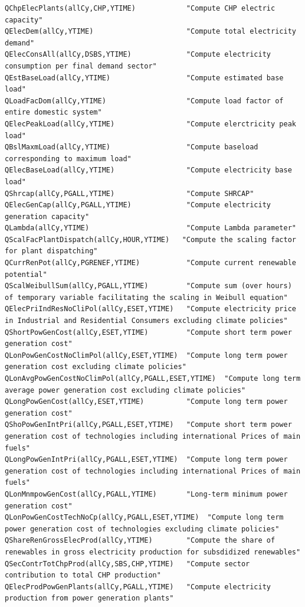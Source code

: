 \documentclass[a4paper,]{scrartcl}
\begin{document}
\begin{lstlisting}
QChpElecPlants(allCy,CHP,YTIME)            "Compute CHP electric capacity"  
QElecDem(allCy,YTIME)                      "Compute total electricity demand"
QElecConsAll(allCy,DSBS,YTIME)             "Compute electricity consumption per final demand sector"
QEstBaseLoad(allCy,YTIME)                  "Compute estimated base load"    
QLoadFacDom(allCy,YTIME)                   "Compute load factor of entire domestic system"
QElecPeakLoad(allCy,YTIME)                 "Compute elerctricity peak load"     
QBslMaxmLoad(allCy,YTIME)                  "Compute baseload corresponding to maximum load"
QElecBaseLoad(allCy,YTIME)                 "Compute electricity base load"
QShrcap(allCy,PGALL,YTIME)                 "Compute SHRCAP" 
QElecGenCap(allCy,PGALL,YTIME)             "Compute electricity generation capacity"
QLambda(allCy,YTIME)                       "Compute Lambda parameter"   
QScalFacPlantDispatch(allCy,HOUR,YTIME)   "Compute the scaling factor for plant dispatching"    
QCurrRenPot(allCy,PGRENEF,YTIME)           "Compute current renewable potential"    
QScalWeibullSum(allCy,PGALL,YTIME)         "Compute sum (over hours) of temporary variable facilitating the scaling in Weibull equation"
QElecPriIndResNoCliPol(allCy,ESET,YTIME)   "Compute electricity price in Industrial and Residential Consumers excluding climate policies"
QShortPowGenCost(allCy,ESET,YTIME)         "Compute short term power generation cost"       
QLonPowGenCostNoClimPol(allCy,ESET,YTIME)  "Compute long term power generation cost excluding climate policies" 
QLonAvgPowGenCostNoClimPol(allCy,PGALL,ESET,YTIME)  "Compute long term average power generation cost excluding climate policies"    
QLongPowGenCost(allCy,ESET,YTIME)          "Compute long term power generation cost"    
QShoPowGenIntPri(allCy,PGALL,ESET,YTIME)   "Compute short term power generation cost of technologies including international Prices of main fuels"  
QLongPowGenIntPri(allCy,PGALL,ESET,YTIME)  "Compute long term power generation cost of technologies including international Prices of main fuels"   
QLonMnmpowGenCost(allCy,PGALL,YTIME)       "Long-term minimum power generation cost"    
QLonPowGenCostTechNoCp(allCy,PGALL,ESET,YTIME)  "Compute long term power generation cost of technologies excluding climate policies"    
QShareRenGrossElecProd(allCy,YTIME)        "Compute the share of renewables in gross electricity production for subsdidized renewables" 
QSecContrTotChpProd(allCy,SBS,CHP,YTIME)   "Compute sector contribution to total CHP production"    
QElecProdPowGenPlants(allCy,PGALL,YTIME)   "Compute electricity production from power generation plants"    

\end{lstlisting}
\end{document}
